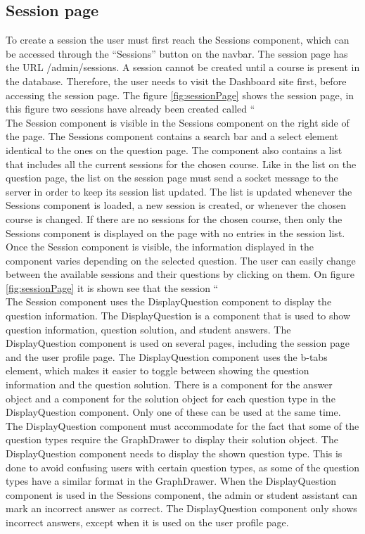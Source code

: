 \subsection{Session page}
To create a session the user must first reach the Sessions component, which can be accessed through the “Sessions” button on the navbar. The session page has the URL /admin/sessions. A session cannot be created until a course is present in the database. Therefore, the user needs to visit the Dashboard site first, before accessing the session page. The figure \ref{fig:sessionPage} shows the session page, in this figure two sessions have already been created called “%
\\[11pt]
The Session component is visible in the Sessions component on the right side of the page. The Sessions component contains a search bar and a select element identical to the ones on the question page. The component also contains a list that includes all the current sessions for the chosen course. Like in the list on the question page, the list on the session page must send a socket message to the server in order to keep its session list updated. The list is updated whenever the Sessions component is loaded, a new session is created, or whenever the chosen course is changed. If there are no sessions for the chosen course, then only the Sessions component is displayed on the page with no entries in the session list.
\\[11pt]
Once the Session component is visible, the information displayed in the component varies depending on the selected question. The user can easily change between the available sessions and their questions by clicking on them. On figure \ref{fig:sessionPage} it is shown see that the session “%
\\[11pt]
The Session component uses the DisplayQuestion component to display the question information. The DisplayQuestion is a component that is used to show question information, question solution, and student answers. The DisplayQuestion component is used on several pages, including the session page and the user profile page. The DisplayQuestion component uses the b-tabs element, which makes it easier to toggle between showing the question information and the question solution. There is a component for the answer object and a component for the solution object for each question type in the DisplayQuestion component. Only one of these can be used at the same time. The DisplayQuestion component must accommodate for the fact that some of the question types require the GraphDrawer to display their solution object. The DisplayQuestion component needs to display the shown question type. This is done to avoid confusing users with certain question types, as some of the question types have a similar format in the GraphDrawer. When the DisplayQuestion component is used in the Sessions component, the admin or student assistant can mark an incorrect answer as correct. The DisplayQuestion component only shows incorrect answers, except when it is used on the user profile page.
